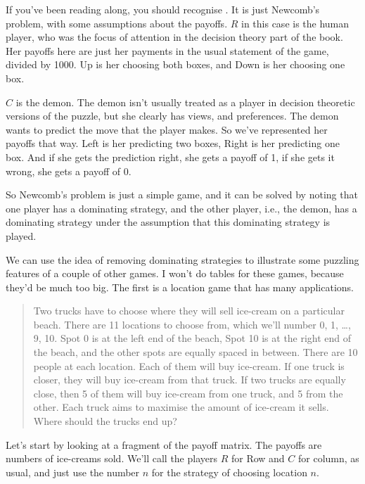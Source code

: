 If you've been reading along, you should recognise . It is just Newcomb's problem, with some assumptions about the payoffs. $R$ in this case is the human player, who was the focus of attention in the decision theory part of the book. Her payoffs here are just her payments in the usual statement of the game, divided by 1000. Up is her choosing both boxes, and Down is her choosing one box.

$C$ is the demon. The demon isn't usually treated as a player in decision theoretic versions of the puzzle, but she clearly has views, and preferences. The demon wants to predict the move that the player makes. So we've represented her payoffs that way. Left is her predicting two boxes, Right is her predicting one box. And if she gets the prediction right, she gets a payoff of 1, if she gets it wrong, she gets a payoff of 0.

So Newcomb's problem is just a simple game, and it can be solved by noting that one player has a dominating strategy, and the other player, i.e., the demon, has a dominating strategy under the assumption that this dominating strategy is played.

We can use the idea of removing dominating strategies to illustrate some puzzling features of a couple of other games. I won't do tables for these games, because they'd be much too big. The first is a location game that has many applications.

\begin{quote}


Two trucks have to choose where they will sell ice-cream on a particular beach. There are 11 locations to choose from, which we'll number 0, 1, \dots, 9, 10. Spot 0 is at the left end of the beach, Spot 10 is at the right end of the beach, and the other spots are equally spaced in between. There are 10 people at each location. Each of them will buy ice-cream. If one truck is closer, they will buy ice-cream from that truck. If two trucks are equally close, then 5 of them will buy ice-cream from one truck, and 5 from the other. Each truck aims to maximise the amount of ice-cream it sells. Where should the trucks end up?

\end{quote}

\noindent Let's start by looking at a fragment of the payoff matrix. The payoffs are numbers of ice-creams sold. We'll call the players $R$ for Row and $C$ for column, as usual, and just use the number $n$ for the strategy of choosing location $n$.

